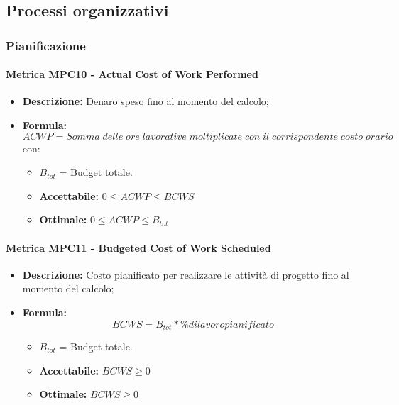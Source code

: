 \subsection{Processi organizzativi}

\subsubsection{Pianificazione}

\paragraph{Metrica MPC10 - Actual Cost of Work Performed}
\begin{itemize}
	\item \textbf{Descrizione:} Denaro speso fino al momento del calcolo;
	\item \textbf{Formula:} $$ACWP = {Somma\; delle\; ore\; lavorative\; moltiplicate\; con\; il\; corrispondente\; costo\; orario}$$
	con:
	\begin{itemize}
		\item $B_{tot}$ = Budget totale.
	\end{itemize}
	 \begin{itemize}
		\item \textbf{Accettabile:}  $0 \leq ACWP \leq BCWS$
		\item \textbf{Ottimale:} $0 \leq ACWP \leq B_{tot}$
	\end{itemize}
\end{itemize}

\paragraph{Metrica MPC11 - Budgeted Cost of Work Scheduled}
\begin{itemize}
	\item \textbf{Descrizione:} Costo pianificato per realizzare le attività di progetto fino al momento del calcolo;
	\item \textbf{Formula:} $$BCWS = {B_{tot} * \% di lavoro pianificato}$$
	\begin{itemize}
		\item $B_{tot}$ = Budget totale.
	\end{itemize}
	\begin{itemize}
		\item \textbf{Accettabile:} $BCWS \geq 0$
		\item \textbf{Ottimale:} $BCWS \geq 0$
	\end{itemize}
\end{itemize}

